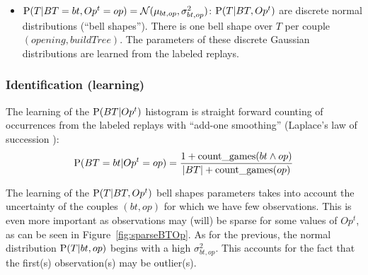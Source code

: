 \begin{itemize}
\item $\mathrm{P}(T | BT=bt, Op^t=op) = \mathcal{N}(\mu_{bt,op},\sigma_{bt,op}^2)$: $\mathrm{P}(T|BT,Op^t)$ are discrete normal distributions (``bell shapes''). There is one bell shape over $T$ per couple $(opening, buildTree)$. The parameters of these discrete Gaussian distributions are learned from the labeled replays.
\end{itemize}

\subsubsection{Identification (learning)}
The learning of the $\mathrm{P}(BT | Op^t)$ histogram is straight forward counting of occurrences from the labeled replays with ``add-one smoothing'' (Laplace's law of succession \citep{Jaynes}):
$$\mathrm{P}(BT=bt|Op^t=op) = \frac{1 + \mathrm{count\_games}(bt\wedge op)}{\left\lvert BT\right\rvert + \mathrm{count\_games}(op)}$$

The learning of the $\mathrm{P}(T | BT, Op^t)$ bell shapes parameters takes into account the uncertainty of the couples $(bt, op)$ for which we have few observations. This is even more important as observations may (will) be sparse for some values of $Op^t$, as can be seen in Figure~\ref{fig:sparseBTOp}. As for the previous, the normal distribution $\mathrm{P}(T|bt, op)$ begins with a high $\sigma_{bt,op}^2$. This accounts for the fact that the first(s) observation(s) may be outlier(s). %

